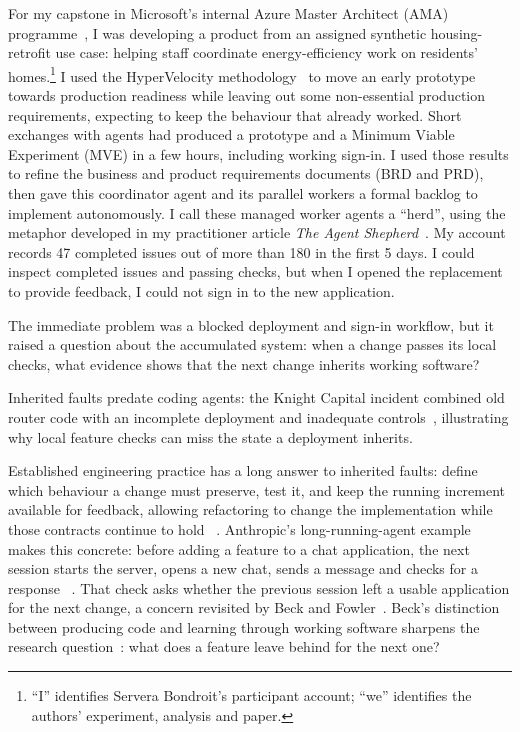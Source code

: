 \documentclass[11pt,a4paper]{article}
\begin{document}
For my capstone in Microsoft's internal Azure Master Architect (AMA)
programme~\cite{microsoftamabadge}, I was developing a product from an assigned synthetic
housing-retrofit use case: helping staff coordinate energy-efficiency
work on residents' homes.\footnote{``I'' identifies Servera Bondroit's participant account; ``we''
identifies the authors' experiment, analysis and paper.}
I used the HyperVelocity methodology~\cite{hvecore} to move an early
prototype towards
production readiness while leaving out some non-essential production
requirements, expecting to keep the behaviour that already worked.
Short exchanges with agents had produced a prototype and a Minimum Viable
Experiment (MVE) in a few hours, including working sign-in. I used those
results to refine the business and product requirements documents (BRD and
PRD), then gave this coordinator agent and its parallel workers a formal backlog to
implement autonomously. I call these managed worker agents a ``herd'', using
the metaphor developed in my practitioner article
\emph{The Agent Shepherd}~\cite{servera2026shepherd}.
My account records 47 completed issues out of more
than 180 in the first 5 days. I could inspect completed issues and passing
checks, but when I opened the replacement to provide feedback, I could not
sign in to the new application.

The immediate problem was a blocked deployment and sign-in workflow,
but it raised a question about the accumulated system:
when a change passes its local checks, what evidence shows that the next
change inherits working software?

Inherited faults predate coding agents: the Knight Capital incident
combined old router code with an incomplete deployment and inadequate
controls~\cite{sec2013knight}, illustrating why local feature checks can
miss the state a deployment inherits.

Established engineering practice has a long answer to inherited faults:
define which behaviour a change must preserve, test it, and keep the
running increment available for feedback, allowing refactoring to change
the implementation while those contracts continue to hold
~\cite{parnas1994aging,beck2002tdd,beck2004xp,fowler2007stamina}.
Anthropic's long-running-agent example makes this concrete: before adding
a feature to a chat application, the next session starts the server,
opens a new chat, sends a message and checks for a response
~\cite[Getting up to speed]{anthropic2025harness}. That check asks whether the previous session left a usable application for the next change, a concern revisited by Beck and Fowler~\cite{beck2026prodacity,fowler2025thoughts}. Beck's distinction between producing code and learning through working
software sharpens the research question~\cite{beck2026prodacity}:
what does a feature leave behind for the next one?
\end{document}
